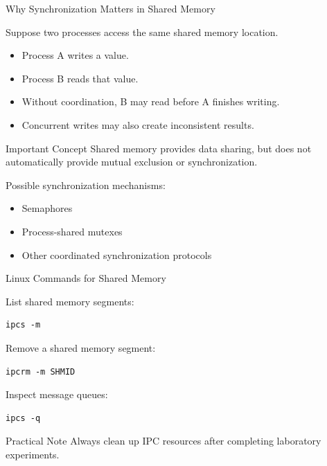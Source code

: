 \documentclass[aspectratio=169,10pt]{beamer}
\begin{document}
\begin{frame}{Why Synchronization Matters in Shared Memory}

Suppose two processes access the same
shared memory location.

\begin{itemize}
    \item Process A writes a value.
    \item Process B reads that value.
    \item Without coordination, B may read
    before A finishes writing.
    \item Concurrent writes may also create
    inconsistent results.
\end{itemize}

\begin{alertblock}{Important Concept}
Shared memory provides data sharing,
but does not automatically provide
mutual exclusion or synchronization.
\end{alertblock}

Possible synchronization mechanisms:

\begin{itemize}
    \item Semaphores
    \item Process-shared mutexes
    \item Other coordinated synchronization protocols
\end{itemize}

\end{frame}

\begin{frame}[fragile]{Linux Commands for Shared Memory}

List shared memory segments:

\begin{lstlisting}[style=terminal]
ipcs -m
\end{lstlisting}

Remove a shared memory segment:

\begin{lstlisting}[style=terminal]
ipcrm -m SHMID
\end{lstlisting}

Inspect message queues:

\begin{lstlisting}[style=terminal]
ipcs -q
\end{lstlisting}

\begin{block}{Practical Note}
Always clean up IPC resources after
completing laboratory experiments.
\end{block}

\end{frame}
\end{document}
